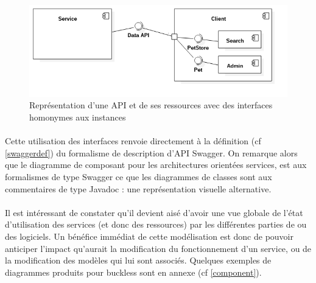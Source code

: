         \newpage
        \begin{figure}[h]
            \centering
            \includegraphics[scale=0.6]{./assets/UML/component2.png}
            \caption{Représentation d'une API et de ses ressources avec des interfaces homonymes aux instances}
        \end{figure}

        \paragraph{}
            Cette utilisation des interfaces renvoie directement à la définition (cf \ref{swaggerdef})
            du formalisme de description d'API Swagger. On remarque alors que le diagramme de composant pour
            les architectures orientées services, est aux formalismes de type Swagger ce que les diagrammes
            de classes sont aux commentaires de type Javadoc : une représentation visuelle alternative.

        \paragraph{}
            Il est intéressant de constater qu'il devient aisé d'avoir une vue globale de l'état
            d'utilisation des services (et donc des ressources) par les différentes parties de ou des
            logiciels. Un bénéfice immédiat de cette modélisation est donc de pouvoir anticiper l'impact
            qu'aurait la modification du fonctionnement d'un service, ou de la modification des modèles
            qui lui sont associés. Quelques exemples de diagrammes produits pour buckless sont en
            annexe (cf \ref{component}).

